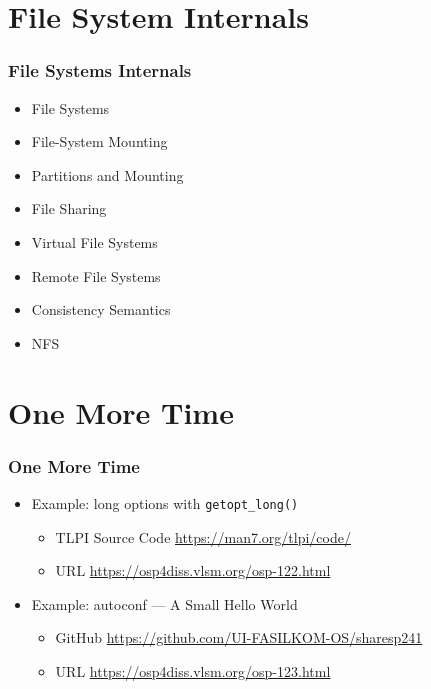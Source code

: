 \documentclass[aspectratio=169, xcolor=table, notheorems, hyperref={pdfpagelabels=false}]{beamer}
\begin{document}
\section{File System Internals}
\begin{frame}[fragile]
\frametitle{File Systems Internals}
\begin{itemize}
\item File Systems
\item File-System Mounting
\item Partitions and Mounting
\item File Sharing
\item Virtual File Systems
\item Remote File Systems
\item Consistency Semantics
\item NFS
\end{itemize}
\end{frame}

\section{One More Time}
\begin{frame}[fragile]
\frametitle{One More Time}
\begin{itemize}
\item Example: long options with \texttt{getopt\_long()}
\begin{itemize}
\item TLPI Source Code \url{https://man7.org/tlpi/code/}
\item URL \url{https://osp4diss.vlsm.org/osp-122.html}
\end{itemize}
\item Example: autoconf --- A Small Hello World
\begin{itemize}
\item GitHub \url{https://github.com/UI-FASILKOM-OS/sharesp241}
\item URL \url{https://osp4diss.vlsm.org/osp-123.html}
\end{itemize}
\end{itemize}
\end{frame}

\end{document}
